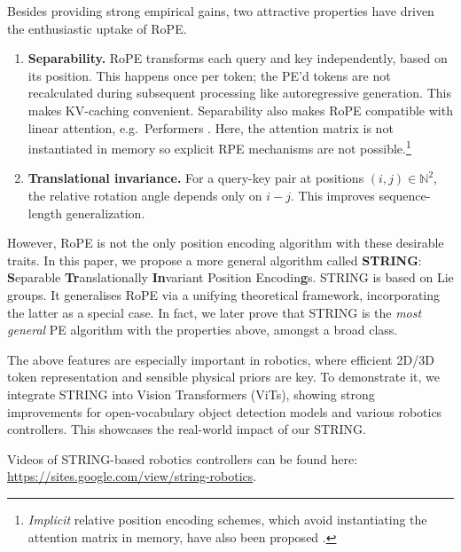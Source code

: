 Besides providing strong empirical gains, two attractive properties have driven the enthusiastic uptake of RoPE. 
\begin{enumerate}[leftmargin=*, itemsep=-1pt, topsep=0pt]
    \item {\textbf{Separability.}}  
    RoPE transforms each query and key independently, based on its position.
    This happens once per token; 
    the PE'd tokens are not recalculated during subsequent processing like autoregressive generation.
    This makes KV-caching convenient. 
    Separability also makes RoPE compatible with linear attention, e.g.~Performers \citep{choromanski2020rethinking, katharopoulos2020transformers}.
    Here, the attention matrix is not instantiated in memory so explicit RPE mechanisms are not possible.\footnote{\emph{Implicit} relative position encoding schemes, which avoid instantiating the attention matrix in memory, have also been proposed \citep{reid2024linear,choromanski2022block,luo2021stable}.} %
    \item {\textbf{Translational invariance.}} 
    For a query-key pair at positions $(i,j)\in\mathbb{N}^2$, the relative rotation angle depends only on $i-j$. 
    This improves sequence-length generalization.
\end{enumerate}
However, RoPE is not the only position encoding algorithm with these desirable traits. 
In this paper, we propose a more general algorithm called \textbf{STRING}: \textbf{S}eparable \textbf{Tr}anslationally \textbf{In}variant Position Encodin\textbf{g}s.
STRING is based on Lie groups. 
It generalises RoPE via a unifying theoretical framework, incorporating the latter as a special case.
In fact, we later prove that STRING is the \emph{most general} PE algorithm with the properties above, amongst a broad class.

The above features are especially important in robotics, where efficient 2D/3D token representation and sensible physical priors are key. 
To demonstrate it, we integrate STRING into Vision Transformers (ViTs), showing strong improvements for open-vocabulary object detection models and various robotics controllers. This showcases the real-world impact of our STRING.




Videos of STRING-based robotics controllers can be found here: \href{ https://sites.google.com/view/string-robotics}{ https://sites.google.com/view/string-robotics}.

